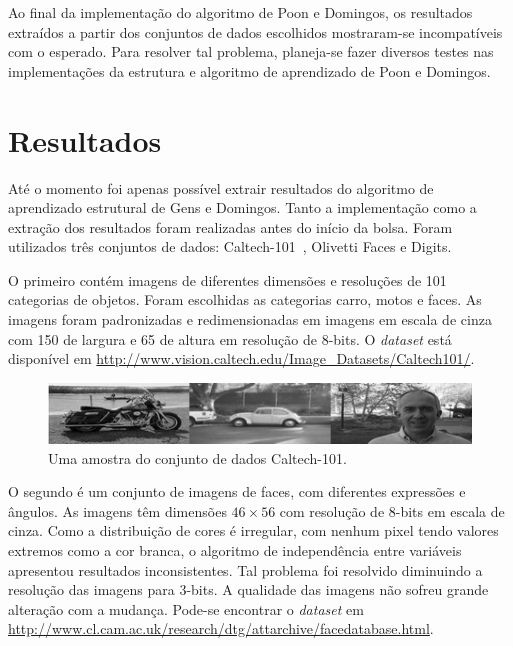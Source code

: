 \documentclass[12pt]{article}
\theoremstyle{plain}
\numberwithin{equation}{section}
\begin{document}
Ao final da implementação do algoritmo de Poon e Domingos, os resultados extraídos a partir dos
conjuntos de dados escolhidos mostraram-se incompatíveis com o esperado. Para resolver tal
problema, planeja-se fazer diversos testes nas implementações da estrutura e algoritmo de
aprendizado de Poon e Domingos.

\section{Resultados}

Até o momento foi apenas possível extrair resultados do algoritmo de aprendizado estrutural de Gens
e Domingos. Tanto a implementação como a extração dos resultados foram realizadas antes do início
da bolsa. Foram utilizados três conjuntos de dados: Caltech-101~\cite{caltech101}, Olivetti Faces e
Digits.

O primeiro contém imagens de diferentes dimensões e resoluções de 101 categorias de
objetos. Foram escolhidas as categorias carro, motos e faces. As imagens foram padronizadas e
redimensionadas em imagens em escala de cinza com 150 de largura e 65 de altura em resolução de
8-bits. O \textit{dataset} está disponível em
\url{http://www.vision.caltech.edu/Image_Datasets/Caltech101/}.

\begin{figure}[h]
  \centering\includegraphics[scale=1.0]{imgs/caltech_sample.png}
  \caption{Uma amostra do conjunto de dados Caltech-101.}
\end{figure}

O segundo é um conjunto de imagens de faces, com diferentes expressões e ângulos. As imagens têm
dimensões $46\times 56$ com resolução de 8-bits em escala de cinza. Como a distribuição de cores é
irregular, com nenhum pixel tendo valores extremos como a cor branca, o algoritmo de independência
entre variáveis apresentou resultados inconsistentes. Tal problema foi resolvido diminuindo a
resolução das imagens para 3-bits. A qualidade das imagens não sofreu grande alteração com a
mudança. Pode-se encontrar o \textit{dataset} em
\url{http://www.cl.cam.ac.uk/research/dtg/attarchive/facedatabase.html}.
\end{document}

